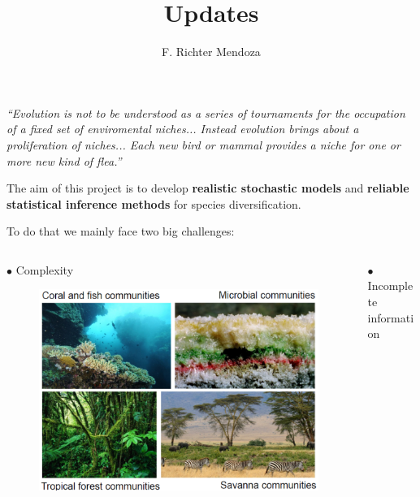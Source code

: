 \documentclass[11pt]{beamer}
\author{F. Richter Mendoza}
\title{Updates}
\begin{document}



\begin{frame}{}
 \emph{ ``Evolution is not to be understood as a series of tournaments for the occupation of a fixed set of enviromental niches... Instead evolution brings about a proliferation of niches... Each new bird or mammal provides a niche for one or more new kind of flea.''}
  \vskip5mm
  \hspace*{}
\end{frame}

\begin{frame}
The aim of this project is to develop {\bf realistic stochastic models} and
{\bf reliable statistical inference methods} for species diversification.\pause \\ \vspace{1cm}
	
	To do that we mainly face two big challenges: 
\begin{columns}
\begin{column}{0.5\textwidth}


$\bullet$ Complexity
 \begin{figure}
                    \includegraphics[width=0.61\linewidth]{figures/communities.png}
		\end{figure}
\end{column}
\begin{column}{0.5\textwidth}  %
    $\bullet$  Incomplete information


\end{column}
\end{columns}
\end{frame}
\end{document}

